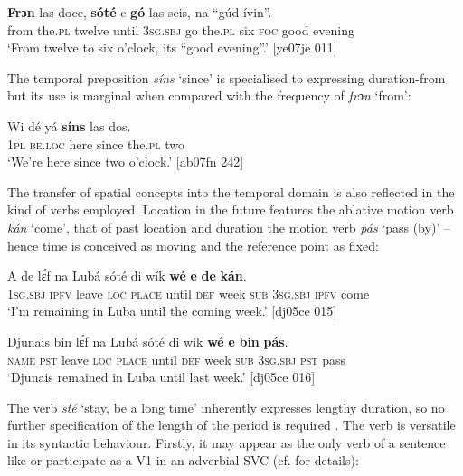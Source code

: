 \ea%
    \label{ex:key:1031}
    \gll \textbf{Frɔn}  las    doce,  \textbf{sóté}    e    \textbf{gó}  las    seis,
na  “gúd    ívin”.\\
from  the.\textsc{pl}  twelve  until  \textsc{3sg.sbj}  go  the.\textsc{pl}  six  
\textsc{foc}  good  evening\\

\glt ‘From twelve to six o’clock, its “good evening”.’ [ye07je 011]
\z

The temporal preposition \textit{síns} ‘since’ is specialised to expressing duration-from but its use is marginal when compared with the frequency of \textit{frɔn} ‘from’: 


\ea%
    \label{ex:key:1032}
    \gll Wi  dé    yá    \textbf{síns}    las    dos.\\
\textsc{1pl}  \textsc{be.loc}  here    since  the.\textsc{pl}  two\\

\glt ‘We’re here since two o’clock.’ [ab07fn 242]
\z

The transfer of spatial concepts into the temporal domain is also reflected in the kind of verbs employed. Location in the future features the ablative motion verb \textit{kán} ‘come’, that of past location and duration the motion verb \textit{pás} ‘pass (by)’ -- hence time is conceived as moving and the reference point as fixed:


\ea%
    \label{ex:key:1033}
    \gll A    de  lɛ́f    na  Lubá  sóté    di  wík
\textbf{wé}  \textbf{e}    \textbf{de}  \textbf{kán}.\\
\textsc{1sg.sbj}  \textsc{ipfv}  leave  \textsc{loc}  \textsc{place}  until  \textsc{def}  week
\textsc{sub}  \textsc{3sg.sbj}  \textsc{ipfv}  come\\

\glt ‘I’m remaining in Luba until the coming week.’ [dj05ce 015]
\z


\ea%
    \label{ex:key:1034}
    \gll Djunais  bin  lɛ́f    na  Lubá  sóté    di  wík
\textbf{wé}  \textbf{e}    \textbf{bin}  \textbf{pás}.\\
\textsc{name}  \textsc{pst}  leave  \textsc{loc}  \textsc{place}  until  \textsc{def}  week
\textsc{sub}  \textsc{3sg.sbj}  \textsc{pst}  pass\\

\glt ‘Djunais remained in Luba until last week.’ [dj05ce 016]
\z

The verb \textit{sté} ‘stay, be a long time’ inherently expresses lengthy duration, so no further specification of the length of the period is required . The verb is versatile in its syntactic behaviour. Firstly, it may appear as the only verb of a sentence like  or participate as a V1 in an adverbial SVC (cf.  for details):


